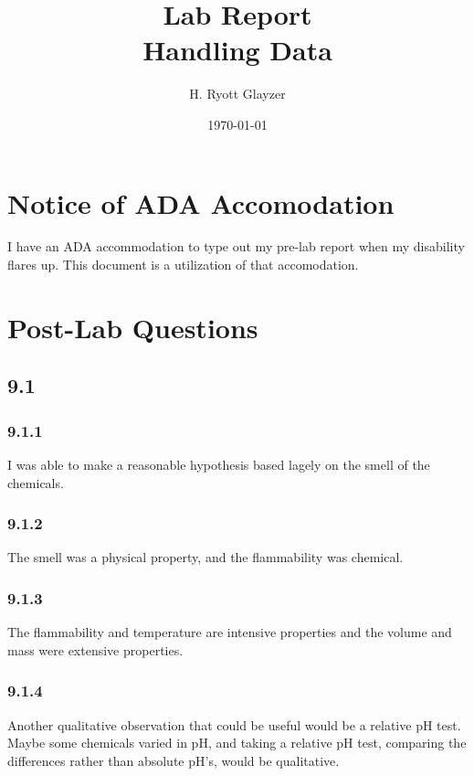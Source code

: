 \documentclass[11pt, letterpaper]{article}
\begin{document}


\title{Lab Report \\ \large Handling Data}
\author{H. Ryott Glayzer}
\date{\today}


\maketitle


\section*{Notice of ADA Accomodation}
I have an ADA accommodation to type out my pre-lab report when my disability flares up.
This document is a utilization of that accomodation.


\section{Post-Lab Questions}
\subsection{9.1}
\subsubsection{9.1.1}
I was able to make a reasonable hypothesis based lagely on the smell of the chemicals.

\subsubsection{9.1.2}
The smell was a physical property, and the flammability was chemical.

\subsubsection{9.1.3}
The flammability and temperature are intensive properties and the volume and mass were extensive properties.

\subsubsection{9.1.4}
Another qualitative observation that could be useful would be a relative pH test. Maybe some chemicals varied in pH,
and taking a relative pH test, comparing the differences rather than absolute pH's, would be qualitative.
\end{document}
